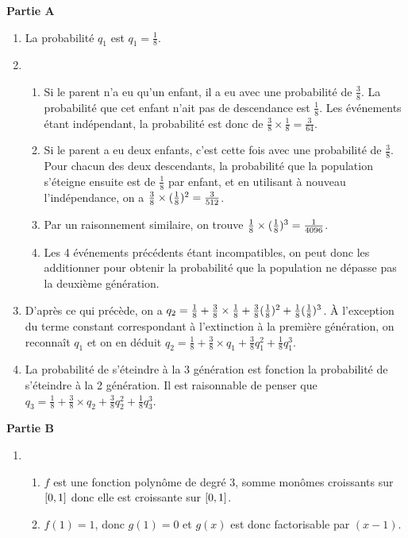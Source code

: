 \documentclass[12pt,a4paper,french]{article}
\begin{document}
\begin{solution}
	\textbf{Partie A}
    
    \begin{enumerate}
    \item La probabilité $q_1$ est $q_1 = \frac18$.
    \item \begin{enumerate}
    \item Si le parent n'a eu qu'un enfant, il a eu avec une
    probabilité de $\frac38$. La probabilité que cet enfant n'ait
    pas de descendance est $\frac18$. Les événements étant
    indépendant, la probabilité est donc de $\frac38 \times \frac18
    = \frac3{64}$.
    \item Si le parent a eu deux enfants, c'est cette fois avec une
    probabilité de $\frac38$. Pour chacun des deux descendants, la
    probabilité que la population s'éteigne ensuite est de
    $\frac18$ par enfant, et en utilisant à nouveau l'indépendance,
    on a $\frac38 \times \brk*{\frac18}^2 = \frac3{512}$.
    \item Par un raisonnement similaire, on trouve $\frac18 \times 
    \brk*{\frac18}^3 = \frac1{4096}$.
    \item Les 4 événements précédents étant incompatibles, on peut
    donc les additionner pour obtenir la probabilité que la
    population ne dépasse pas la deuxième génération.
    \end{enumerate}
    \item D'après ce qui précède, on a $q_2 = \frac18 + \frac38
    \times \frac18 + \frac38 \brk*{\frac18}^2 + \frac18 
    \brk*{\frac18}^3$. \`A l'exception du terme constant 
    correspondant à l'extinction à la première génération, on 
    reconnaît $q_1$ et on en déduit $q_2 = \frac18 + \frac38
    \times q_1 + \frac38 q_1^2 + \frac18 q_1^3$.
    \item La probabilité de s'éteindre à la 3 génération
    est fonction la probabilité de s'éteindre à la 2
    génération. Il est raisonnable de penser que $q_3 = \frac18 +
    \frac38\times q_2 + \frac38 q_2^2 + \frac18 q_3^3$.
    \end{enumerate}
    \textbf{Partie B}
    
    \begin{enumerate}
    \item \begin{enumerate}
    \item $f$ est une fonction polynôme de degré 3, somme monômes 
    croissants sur $\intv{0}{1}$ donc elle est croissante sur 
    $\intv{0}{1}$.
    \item $f(1) = 1$, donc $g(1) = 0$ et $g(x)$ est donc 
    factorisable par $(x-1)$.
    

\end{enumerate}
\end{enumerate}
\end{solution}
\end{document}
